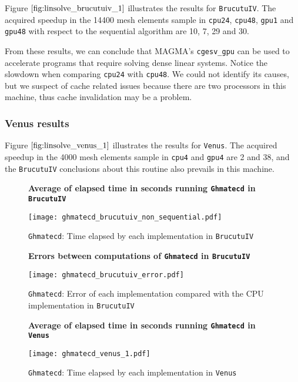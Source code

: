 Figure $\ref{fig:linsolve_brucutuiv_1}$ illustrates the results for \texttt{BrucutuIV}. The acquired speedup in the 14400 mesh 
elements sample in \texttt{cpu24}, \texttt{cpu48}, \texttt{gpu1} and \texttt{gpu48} with respect to 
the sequential algorithm are 10, 7, 29 and 30. 

From these results, we can conclude that MAGMA's \texttt{cgesv\_gpu} can be used 
to accelerate programs that require solving dense linear systems. Notice the slowdown when comparing 
\texttt{cpu24} with \texttt{cpu48}. We could not identify its causes, but we suspect of cache related issues 
because there are two processors in this machine, thus cache invalidation may be a problem.

\subsubsection{Venus results}

Figure $\ref{fig:linsolve_venus_1}$ illustrates the results 
for \texttt{Venus}. The acquired speedup in the 4000 mesh 
elements sample in \texttt{cpu4} and \texttt{gpu4} are 2 and 38, 
and the \texttt{BrucutuIV} conclusions about this routine also prevails in this machine.

\begin{figure}[ht]
\centering
\textbf{Average of elapsed time in seconds running \texttt{Ghmatecd} in \texttt{BrucutuIV}}\par\medskip
\texttt{[image: ghmatecd\_brucutuiv\_non\_sequential.pdf]}
\caption{\texttt{Ghmatecd}: Time elapsed by each implementation in \texttt{BrucutuIV}}
\label{fig:ghmatecd_brucutuiv_non_sequential}
\end{figure}

\begin{figure}[ht]
\centering
\textbf{Errors between computations of \texttt{Ghmatecd} in \texttt{BrucutuIV}}\par\medskip
\texttt{[image: ghmatecd\_brucutuiv\_error.pdf]}
\caption{\texttt{Ghmatecd}: Error of each implementation compared with the CPU implementation in \texttt{BrucutuIV}}
\label{fig:ghmatecd_brucutuiv_error}
\end{figure}

\begin{figure}[ht]
\centering
\textbf{Average of elapsed time in seconds running \texttt{Ghmatecd} in \texttt{Venus}}\par\medskip
\texttt{[image: ghmatecd\_venus\_1.pdf]}
\caption{\texttt{Ghmatecd}: Time elapsed by each implementation in \texttt{Venus}}
\label{fig:ghmatecd_venus_1}
\end{figure}

